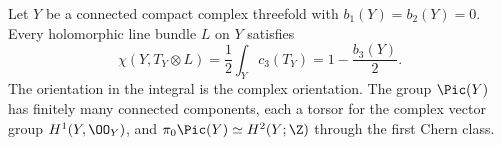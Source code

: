 
\begin{proposition}\hypertarget{tag-01BN}{}\label{cdp:st:C.1.1}


Let $Y$ be a connected compact complex threefold with
$b_1(Y)=b_2(Y)=0$. Every holomorphic line bundle $L$ on $Y$ satisfies
\[
 \chi(Y,T_Y\otimes L)=\frac12\int_Yc_3(T_Y)
 =1-\frac{b_3(Y)}2.
\]
The orientation in the integral is the complex orientation. The group
$\Pic(Y)$ has finitely many connected components, each a torsor for the
complex vector group $H^1(Y,\OO_Y)$, and
$\pi_0\Pic(Y)\simeq H^2(Y;\Z)$ through the first Chern class.
\end{proposition}

